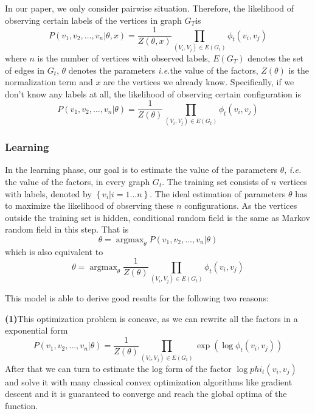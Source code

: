 \documentclass{sig-alternate}
\begin{document}
In our paper, we only consider pairwise situation. Therefore, the likelihood of observing certain labels of the vertices in graph $G_T$is \begin{displaymath}P(v_1,v_2,...,v_n|\theta,x)=\frac{1}{Z(\theta,x)}\prod _{(V_i,V_j)\in E(G_t)}\phi_{t}(v_i,v_j)\end{displaymath}
where $n$ is the number of vertices with observed labels, $E(G_T)$ denotes the set of edges in $G_t$, $\theta$ denotes the parameters \emph{i.e.}the value of the factors, $Z(\theta)$ is the normalization term and $x$ are the vertices we already know. Specifically, if we don't know any labels at all, the likelihood of observing certain configuration is \begin{displaymath}P(v_1,v_2,...,v_n|\theta)=\frac{1}{Z(\theta)}\prod _{(V_i,V_j)\in E(G_t)}\phi_{t}(v_i,v_j)\end{displaymath}

\subsubsection{Learning}
In the learning phase, our goal is to estimate the value of the parameters $\theta$, \emph{i.e.} the value of the factors, in every graph $G_t$. The training set consists of $n$ vertices with labels, denoted by $\left \{ v_{i}|i=1...n \right \}$. The ideal estimation of parameters $\theta$ has to maximize the likelihood of observing these $n$ configurations. As the vertices outside the training set is hidden, conditional random field is the same as Markov random field in this step. That is\begin{displaymath}\theta=\mathop{\arg\max}_{\theta}P(v_1,v_2,...,v_n|\theta)\end{displaymath} which is also equivalent to \begin{displaymath}\theta=\mathop{\arg\max}_{\theta}\frac{1}{Z(\theta)}\prod _{(V_i,V_j)\in E(G_t)}\phi_{t}(v_i,v_j)\end{displaymath}

This model is able to derive good results for the following two reasons: 

\textbf{(1)}This optimization problem is concave, as we can rewrite all the factors in a exponential form \begin{displaymath}P(v_1,v_2,...,v_n|\theta)=\frac{1}{Z(\theta)}\prod _{(V_i,V_j)\in E(G_t)}\exp{(\log{\phi_{t}(v_i,v_j)})}\end{displaymath} After that we can turn to estimate the log form of the factor $\log{phi_{t}(v_i,v_j)}$ and solve it with many classical convex optimization algorithms like gradient descent and it is guaranteed to converge and reach the global optima of the function. 
\end{document}
